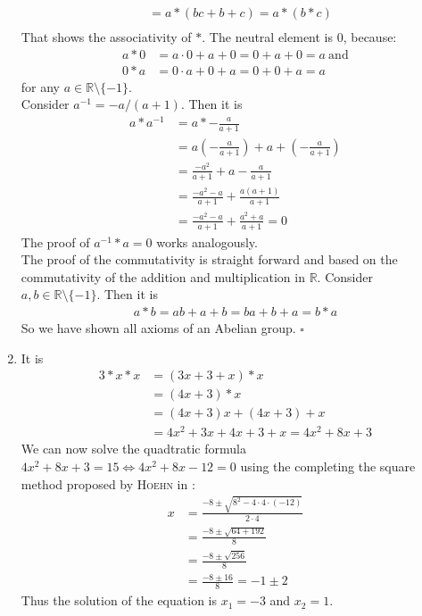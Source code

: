 \documentclass[solution]{tudexercise}
\newcommand{\qed}{\hspace*{\fill}$\square$}
\begin{document}
\begin{enumerate}
\begin{align*}
&= a * (bc + b + c) = a * (b * c)\\
				\end{align*}
				That shows the associativity of $*$.
				\newpage
				The neutral element is $0$, because: 
				\begin{align*}
a * 0 &= a \cdot 0 + a + 0 = 0 + a + 0 = a\ \text{and}\\
0 * a &= 0 \cdot a + 0 + a = 0 + 0 + a = a
				\end{align*}
				for any $a \in \mathbb{R} \setminus \{-1\}$.\\
				Consider $a^{-1} = -a / (a + 1)$. Then it is
				\begin{align*}
a * a^{-1} &= a * - \frac{a}{a + 1}\\
&= a(- \frac{a}{a + 1}) + a + (- \frac{a}{a + 1})\\
&= \frac{-a^2}{a + 1} + a - \frac{a}{a + 1}\\
&= \frac{-a^2 - a}{a + 1} + \frac{a(a + 1)}{a + 1}\\
&= \frac{-a^2 - a}{a + 1} + \frac{a^2 + a}{a + 1} = 0
				\end{align*}
				The proof of $a^{-1} * a = 0$ works analogously.\\
				The proof of the commutativity is straight forward and based on the commutativity of the addition and multiplication in $\mathbb{R}$. Consider $a, b \in \mathbb{R} \setminus \{-1\}$. Then it is
				\begin{align*}
a * b = ab + a + b = ba + b + a = b * a
				\end{align*}
				So we have shown all axioms of an Abelian group. \qed
				
				\item
				It is
				\begin{align*}
3 * x * x &= (3x + 3 + x) * x\\
&= (4x + 3) * x\\
&= (4x + 3)x + (4x + 3) + x\\
&= 4x^2 + 3x + 4x + 3 + x = 4x^2 + 8x + 3
				\end{align*}
				We can now solve the quadtratic formula $4x^2 + 8x + 3 = 15 \Longleftrightarrow 4x^2 + 8x - 12 = 0$ using the completing the square method proposed by \textsc{Hoehn} in \cite{hoehn1975more}:
				\begin{align*}
x &= \frac{-8 \pm \sqrt{8^2 - 4 \cdot 4 \cdot (-12)}}{2 \cdot 4}\\
&= \frac{-8 \pm \sqrt{64 + 192}}{8}\\
&= \frac{-8 \pm \sqrt{256}}{8}\\
&= \frac{-8 \pm 16}{8} = -1 \pm 2
				\end{align*}
				Thus the solution of the equation is $x_1 = -3$ and $x_2 = 1$.
				\end{enumerate}
			
\end{document}
